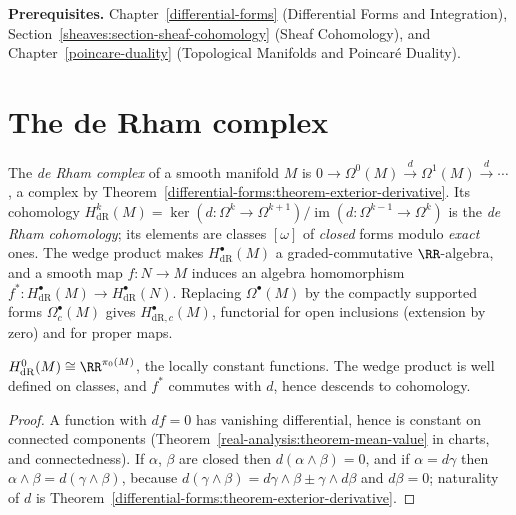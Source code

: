 \noindent\textbf{Prerequisites.} Chapter~\ref{differential-forms} (Differential Forms and Integration), Section~\ref{sheaves:section-sheaf-cohomology}
(Sheaf Cohomology), and Chapter~\ref{poincare-duality} (Topological Manifolds and Poincar\'e Duality).

\section{The de Rham complex}\label{de-rham:section-complex}

\begin{definition}\label{de-rham:definition-de-rham}
The \emph{de Rham complex} of a smooth manifold $M$ is $0 \to \Omega^0(M) \xrightarrow{d} \Omega^1(M) \xrightarrow{d} \cdots$, a complex by Theorem~\ref{differential-forms:theorem-exterior-derivative}. Its
cohomology $H^k_{\mathrm{dR}}(M) = \ker(d \colon \Omega^k \to \Omega^{k+1})/\operatorname{im}(d \colon \Omega^{k-1} \to \Omega^k)$ is the \emph{de Rham cohomology}; its elements are classes $[\omega]$ of
\emph{closed} forms modulo \emph{exact} ones. The wedge product makes $H^\bullet_{\mathrm{dR}}(M)$ a graded-commutative $\RR$-algebra, and a smooth map $f \colon N \to M$ induces an algebra homomorphism
$f^* \colon H^\bullet_{\mathrm{dR}}(M) \to H^\bullet_{\mathrm{dR}}(N)$. Replacing $\Omega^\bullet(M)$ by the compactly supported forms $\Omega^\bullet_c(M)$ gives $H^\bullet_{\mathrm{dR},c}(M)$, functorial for
open inclusions (extension by zero) and for proper maps.
\end{definition}

\begin{proposition}\label{de-rham:proposition-h0}
$H^0_{\mathrm{dR}}(M) \cong \RR^{\pi_0(M)}$, the locally constant functions. The wedge product is well defined on classes, and $f^*$ commutes with $d$, hence descends to cohomology.
\end{proposition}

\begin{proof}
A function with $df = 0$ has vanishing differential, hence is constant on connected components (Theorem~\ref{real-analysis:theorem-mean-value} in charts, and connectedness). If $\alpha$, $\beta$ are closed then
$d(\alpha \wedge \beta) = 0$, and if $\alpha = d\gamma$ then $\alpha \wedge \beta = d(\gamma \wedge \beta)$, because $d(\gamma \wedge \beta) = d\gamma \wedge \beta \pm \gamma \wedge d\beta$ and $d\beta = 0$; naturality of $d$ is
Theorem~\ref{differential-forms:theorem-exterior-derivative}.
\end{proof}

